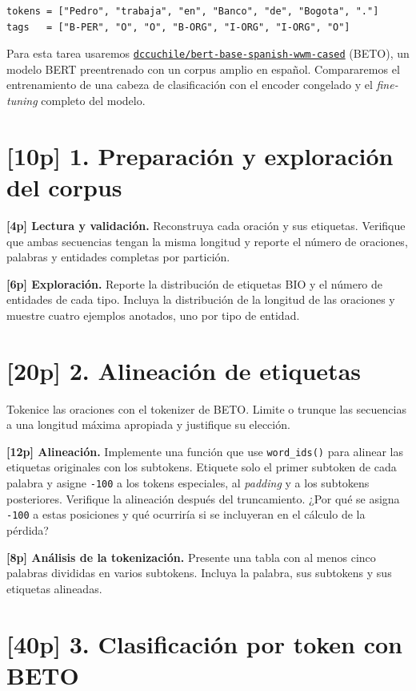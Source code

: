 \documentclass[11pt,a4paper]{article}
\begin{document}
\begin{lstlisting}[style=ejemplo]
tokens = ["Pedro", "trabaja", "en", "Banco", "de", "Bogota", "."]
tags   = ["B-PER", "O", "O", "B-ORG", "I-ORG", "I-ORG", "O"]
\end{lstlisting}

Para esta tarea usaremos \href{https://huggingface.co/dccuchile/bert-base-spanish-wwm-cased}{\texttt{dccuchile/bert-base-spanish-wwm-cased}} (BETO), un modelo BERT preentrenado con un corpus amplio en español. Compararemos el entrenamiento de una cabeza de clasificación con el encoder congelado y el \textit{fine-tuning} completo del modelo.

\section*{[10p] 1. Preparación y exploración del corpus}

\textbf{[4p] Lectura y validación.} Reconstruya cada oración y sus etiquetas. Verifique que ambas secuencias tengan la misma longitud y reporte el número de oraciones, palabras y entidades completas por partición.

\textbf{[6p] Exploración.} Reporte la distribución de etiquetas BIO y el número de entidades de cada tipo. Incluya la distribución de la longitud de las oraciones y muestre cuatro ejemplos anotados, uno por tipo de entidad.

\section*{[20p] 2. Alineación de etiquetas}

Tokenice las oraciones con el tokenizer de BETO. Limite o trunque las secuencias a una longitud máxima apropiada y justifique su elección.

\textbf{[12p] Alineación.} Implemente una función que use \texttt{word\_ids()} para alinear las etiquetas originales con los subtokens. Etiquete solo el primer subtoken de cada palabra y asigne \texttt{-100} a los tokens especiales, al \textit{padding} y a los subtokens posteriores. Verifique la alineación después del truncamiento. ¿Por qué se asigna \texttt{-100} a estas posiciones y qué ocurriría si se incluyeran en el cálculo de la pérdida?

\textbf{[8p] Análisis de la tokenización.} Presente una tabla con al menos cinco palabras divididas en varios subtokens. Incluya la palabra, sus subtokens y sus etiquetas alineadas.

\section*{[40p] 3. Clasificación por token con BETO}
\end{document}
